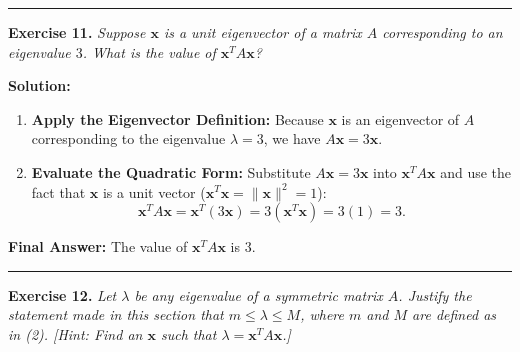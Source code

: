 \documentclass[11pt, letterpaper]{article}
\theoremstyle{definition}
\theoremstyle{remark}
\begin{document}
\medskip
\hrule
\medskip

\textbf{Exercise 11.} \emph{Suppose $\mathbf{x}$ is a unit eigenvector of a matrix $A$ corresponding to an eigenvalue $3$. What is the value of $\mathbf{x}^T A \mathbf{x}$?}

\textbf{Solution:}
\begin{enumerate}[label=\textbf{Step \arabic*:}]
    \item \textbf{Apply the Eigenvector Definition:}
    Because $\mathbf{x}$ is an eigenvector of $A$ corresponding to the eigenvalue $\lambda = 3$, we have $A\mathbf{x} = 3\mathbf{x}$.
    \item \textbf{Evaluate the Quadratic Form:}
    Substitute $A\mathbf{x} = 3\mathbf{x}$ into $\mathbf{x}^T A \mathbf{x}$ and use the fact that $\mathbf{x}$ is a unit vector ($\mathbf{x}^T\mathbf{x} = \|\mathbf{x}\|^2 = 1$):
    \[
    \mathbf{x}^T A \mathbf{x} = \mathbf{x}^T (3\mathbf{x}) = 3(\mathbf{x}^T \mathbf{x}) = 3(1) = 3.
    \]
\end{enumerate}
\textbf{Final Answer:} The value of $\mathbf{x}^T A \mathbf{x}$ is $3$.

\medskip
\hrule
\medskip

\textbf{Exercise 12.} \emph{Let $\lambda$ be any eigenvalue of a symmetric matrix $A$. Justify the statement made in this section that $m \le \lambda \le M$, where $m$ and $M$ are defined as in (2). [Hint: Find an $\mathbf{x}$ such that $\lambda = \mathbf{x}^T A \mathbf{x}$.]}
\end{document}

